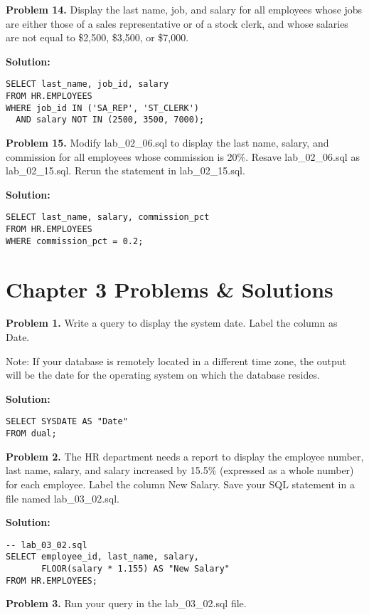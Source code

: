 \documentclass[12pt,a4paper]{article}
\begin{document}
\textbf{Problem 14.} Display the last name, job, and salary for all employees whose jobs are either those of a sales representative or of a stock clerk, and whose salaries are not equal to \$2,500, \$3,500, or \$7,000.

\textbf{Solution:}
\begin{lstlisting}[style=sqlstyle]
SELECT last_name, job_id, salary
FROM HR.EMPLOYEES
WHERE job_id IN ('SA_REP', 'ST_CLERK')
  AND salary NOT IN (2500, 3500, 7000);
\end{lstlisting}

\textbf{Problem 15.} Modify lab\_02\_06.sql to display the last name, salary, and commission for all employees whose commission is 20\%. Resave lab\_02\_06.sql as lab\_02\_15.sql. Rerun the statement in lab\_02\_15.sql.

\textbf{Solution:}
\begin{lstlisting}[style=sqlstyle]
SELECT last_name, salary, commission_pct
FROM HR.EMPLOYEES
WHERE commission_pct = 0.2;
\end{lstlisting}

\section{Chapter 3 Problems \& Solutions}

\textbf{Problem 1.} Write a query to display the system date. Label the column as Date.

Note: If your database is remotely located in a different time zone, the output will be the date for the operating system on which the database resides.

\textbf{Solution:}
\begin{lstlisting}[style=sqlstyle]
SELECT SYSDATE AS "Date"
FROM dual;
\end{lstlisting}

\textbf{Problem 2.} The HR department needs a report to display the employee number, last name, salary, and salary increased by 15.5\% (expressed as a whole number) for each employee. Label the column New Salary. Save your SQL statement in a file named lab\_03\_02.sql.

\textbf{Solution:}
\begin{lstlisting}[style=sqlstyle]
-- lab_03_02.sql
SELECT employee_id, last_name, salary,
       FLOOR(salary * 1.155) AS "New Salary"
FROM HR.EMPLOYEES;
\end{lstlisting}

\textbf{Problem 3.} Run your query in the lab\_03\_02.sql file.
\end{document}

